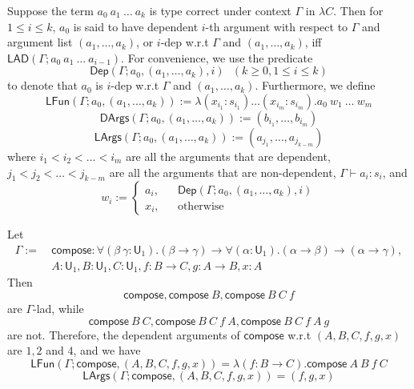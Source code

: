 \begin{definition} Suppose the term $a_0 \ a_1 \ \dots \ a_k$ is type correct under
  context $\Gamma$ in $\lambda C$. Then for $1 \leq i \leq k$, $a_0$ is said to have dependent $i$-th argument
  with respect to $\Gamma$ and argument list $(a_1, \dots, a_k)$, or $i$-dep w.r.t
  $\Gamma$ and $(a_1, \dots, a_k)$, iff $\mathsf{LAD}(\Gamma; a_0 \ a_1 \ \dots \ a_{i - 1})$.
  For convenience, we use the predicate
  $$\mathsf{Dep}(\Gamma; a_0, (a_1, \dots, a_k), i) \ \ \ (k \geq 0, 1 \leq i \leq k)$$
  to denote that $a_0$ is $i$-dep w.r.t $\Gamma$ and $(a_1, \dots, a_k)$. Furthermore, we define
  $$\mathsf{LFun}(\Gamma; a_0, (a_1, \dots, a_k)) := \lambda (x_{i_1} : s_{i_1}) \dots (x_{i_m} : s_{i_m}). a_0 \ w_1 \ \dots \ w_m$$
  $$\mathsf{DArgs}(\Gamma; a_0, (a_1, \dots, a_k)) := (b_{i_1}, \dots, b_{i_m})$$
  $$\mathsf{LArgs}(\Gamma; a_0, (a_1, \dots, a_k)) := (a_{j_1}, \dots, a_{j_{k - m}})$$
  where $i_1 < i_2 < \dots < i_m$ are all the arguments that are dependent, $j_1 < j_2 < \dots < j_{k - m}$
  are all the arguments that are non-dependent, $\Gamma \vdash a_i : s_i$, and
  $$w_i := \left\{\begin{aligned}
    a_i, & & \mathsf{Dep}(\Gamma; a_0, (a_1, \dots, a_k), i) \\
    x_i, & & \text{otherwise}
  \end{aligned}\right.$$
\end{definition}

\begin{example} Let
  \begin{align*}
    \Gamma := & \ \mathsf{compose} : \forall (\beta \ \gamma: \mathsf{U}_1).
      (\beta \to \gamma) \to \forall (\alpha : \mathsf{U}_1). (\alpha \to \beta) \to (\alpha \to \gamma), \\
      & \ A : \mathsf{U}_1, B : \mathsf{U}_1, C : \mathsf{U}_1, f : B \to C, g : A \to B, x : A
  \end{align*}
  Then
  $$\mathsf{compose}, \mathsf{compose} \ B, \mathsf{compose} \ B \ C \ f$$
  are $\Gamma$-lad, while
  $$\mathsf{compose} \ B \ C, \mathsf{compose} \ B \ C \ f \ A, \mathsf{compose} \ B \ C \ f \ A \ g$$
  are not. Therefore, the dependent arguments of $\mathsf{compose}$ w.r.t $(A, B, C, f, g, x)$
  are $1, 2$ and $4$, and we have
  $$\mathsf{LFun}(\Gamma; \mathsf{compose}, (A, B, C, f, g, x)) = \lambda (f : B \to C). \mathsf{compose} \ A \ B \ f \ C$$
  $$\mathsf{LArgs}(\Gamma; \mathsf{compose}, (A, B, C, f, g, x)) = (f, g, x)$$
\end{example}

